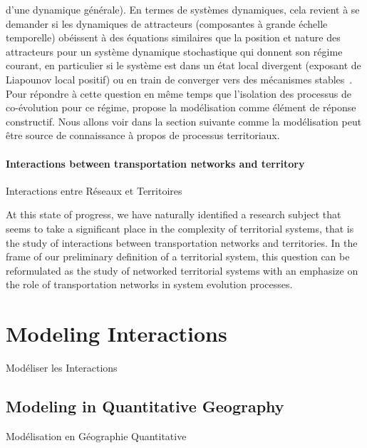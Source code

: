{    d'une dynamique générale). En termes de systèmes dynamiques, cela revient à se demander si les dynamiques de attracteurs 
    (composantes à grande échelle temporelle) obéissent à des équations similaires que la position et nature des attracteurs pour un système dynamique stochastique qui donnent son régime courant, en particulier si le système est dans un état local divergent (exposant de Liapounov local positif) ou en train de converger vers des mécanismes stables~\cite{sanders1992systeme}. Pour répondre à cette question en même temps que l'isolation des processus de co-évolution pour ce régime, \cite{bretagnolle:tel-00459720} propose la modélisation comme élément de réponse constructif. Nous allons voir dans la section suivante comme la modélisation peut être source de connaissance à propos de processus territoriaux. 
}


\paragraph{Interactions between transportation networks and territory}{Interactions entre Réseaux et Territoires}

At this state of progress, we have naturally identified a research subject that seems to take a significant place in the complexity of territorial systems, that is the study of interactions between transportation networks and territories. In the frame of our preliminary definition of a territorial system, this question can be reformulated as the study of networked territorial systems with an emphasize on the role of transportation networks in system evolution processes.




\newpage

\section{Modeling Interactions}{Modéliser les Interactions}


\subsection{Modeling in Quantitative Geography}{Modélisation en Géographie Quantitative}


